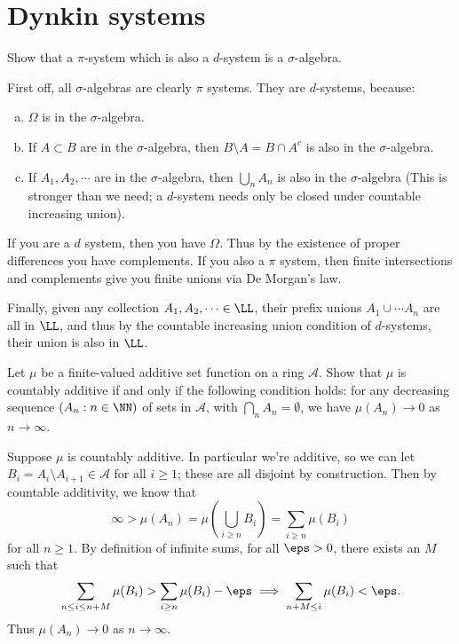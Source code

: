 \documentclass[11pt, headheight=30pt]{scrartcl}
\begin{document}
\pagebreak
\section{Dynkin systems}
\begin{prob*}
    Show that a $\pi$-system which is also a $d$-system is a $\sigma$-algebra.
\end{prob*}

First off, all $\sigma$-algebras are clearly $\pi$ systems.
They are $d$-systems, because:
\begin{enumerate}[(a)]
    \item $\Omega$ is in the $\sigma$-algebra.
    \item If $A\subset B$ are in the $\sigma$-algebra, then
    $B\setminus A = B\cap A^c$ is also in the $\sigma$-algebra.
    \item If $A_1, A_2, \cdots$ are in the $\sigma$-algebra, then
    $\bigcup_n A_n$ is also in the $\sigma$-algebra
    (This is stronger than we need; a $d$-system needs only be closed under
    countable increasing union).
\end{enumerate}

If you are a $d$ system, then you have $\Omega$.
Thus by the existence of proper differences you have complements. If you
also a $\pi$ system, then finite intersections and complements give you
finite unions via De Morgan's law.

Finally, given any collection $A_1, A_2,\cdots \in \LL$,
their prefix unions $A_1\cup \cdots A_n$ are all in $\LL$, and thus by
the countable increasing union condition of $d$-systems,
their union is also in $\LL$.

\pagebreak
\begin{prob*}
    Let $\mu$ be a finite-valued additive set function on a ring $\mathcal{A}$.
    Show that $\mu$ is countably additive if and only if the following
    condition holds: for any decreasing sequence $(A_n : n \in \NN)$
    of sets in $\mathcal{A}$, with $\bigcap_n A_n = \emptyset$, we have
    $\mu(A_n) \to 0$ as $n \to \infty$.
\end{prob*}

\begin{psec*}
    Suppose $\mu$ is countably additive. In particular we're additive,
    so we can let $B_i = A_{i}\setminus A_{i+1}\in \mathcal{A}$ for all $i\geq 1$;
    these are all disjoint by construction.
    Then by countable additivity, we know that
    \[
        \infty > \mu(A_n) = \mu\left(\bigcup_{i\geq n} B_i\right) = \sum_{i\geq n} \mu(B_i)  
    \]
    for all $n\geq 1$. By definition of infinite sums, for all
    $\eps > 0$, there exists an $M$ such that
    \[
        \sum_{n\leq i\leq n + M} \mu(B_i) > \sum_{i\geq n} \mu(B_i) - \eps \implies \sum_{n + M\leq i} \mu(B_i) < \eps.
    \]
    Thus $\mu(A_n) \to 0$ as $n\to \infty$.
\end{psec*}
\end{document}
